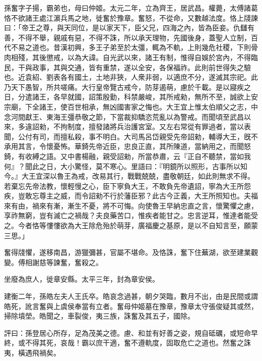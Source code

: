 \begin{pinyinscope}
 
 
 孫奮字子揚，霸弟也，母曰仲姬。太元二年，立為齊王，居武昌。權薨，太傅諸葛恪不欲諸王處江濵兵馬之地，徙奮於豫章。奮怒，不從命，又數越法度。恪上牋諫曰：「帝王之尊，與天同位，是以家天下，臣父兄，四海之內，皆為臣妾。仇讎有善，不得不舉，親戚有惡，不得不誅，所以承天理物，先國後身，蓋聖人立制，百代不易之道也。昔漢初興，多王子弟至於太彊，輒為不軌，上則幾危社稷，下則骨肉相殘，其後懲戒，以為大諱。自光武以來，諸王有制，惟得自娛於宮內，不得臨民，干與政事，其與交通，皆有重禁，遂以全安，各保福祚。此則前世得失之驗也。近袁紹、劉表各有國土，土地非狹，人衆非弱，以適庶不分，遂滅其宗祀。此乃天下愚智，所共嗟痛。大行皇帝覽古戒今，防芽遏萌，慮於千載。是以寢疾之日，分遣諸王，各早就國，詔策殷勤，科禁嚴峻，其所戒勑，無所不至，誠欲上安宗廟，下全諸王，使百世相承，無凶國害家之悔也。大王宜上惟太伯順父之志，中念河間獻王、東海王彊恭敬之節，下當裁抑驕恣荒亂以為警戒。而聞頃至武昌以來，多違詔勑，不拘制度，擅發諸將兵治護宮室。又左右常從有罪過者，當以表聞，公付有司，而擅私殺，事不明白。大司馬呂岱親受先帝詔勑，輔導大王，旣不承用其言，令懷憂怖。華錡先帝近臣，忠良正直，其所陳道，當納用之，而聞怒錡，有收縛之語。又中書楊融，親受詔勑，所當恭肅，云『正自不聽禁，當如我何』？聞此之日，大小驚怪，莫不寒心。里語曰：『明鏡所以照形，古事所以知今。』大王宜深以魯王為戒，改易其行，戰戰兢兢，盡敬朝廷，如此則無求不得。若棄忘先帝法教，懷輕慢之心，臣下寧負大王，不敢負先帝遺詔，寧為大王所怨疾，豈敢忘尊主之威，而令詔勑不行於藩臣邪？此古今正義，大王所照知也。夫福來有由，禍來有漸，漸生不憂，將不可悔。向使魯王早納忠直之言，懷驚懼之慮，享祚無窮，豈有滅亡之禍哉？夫良藥苦口，惟疾者能甘之。忠言逆耳，惟達者能受之。今者恪等慺慺欲為大王除危殆於萌芽，廣福慶之基原，是以不自知言至，願蒙三思。」
 
 
 
 
 奮得牋懼，遂移南昌，游獵彌甚，官屬不堪命。及恪誅，奮下住蕪湖，欲至建業觀變。傅相謝慈等諫奮，奮殺之。
 
 
 坐廢為庶人，徙章安縣。太平三年，封為章安侯。
 
 
建衡二年，孫皓左夫人王氏卒。皓哀念過甚，朝夕哭臨，數月不出，由是民間或謂皓死，訛言奮與上虞侯奉當有立者。奮母仲姬墓在豫章，豫章太守張俊疑其或然，掃除墳塋。皓聞之，車裂俊，夷三族，誅奮及其五子，國除。
 
 
 
 
 評曰：孫登居心所存，足為茂美之德。慮、和並有好善之姿，規自砥礪，或短命早終，或不得其死，哀哉！霸以庶干適，奮不遵軌度，固取危亡之道也。然奮之誅夷，橫遇飛禍矣。
 
 
\end{pinyinscope}